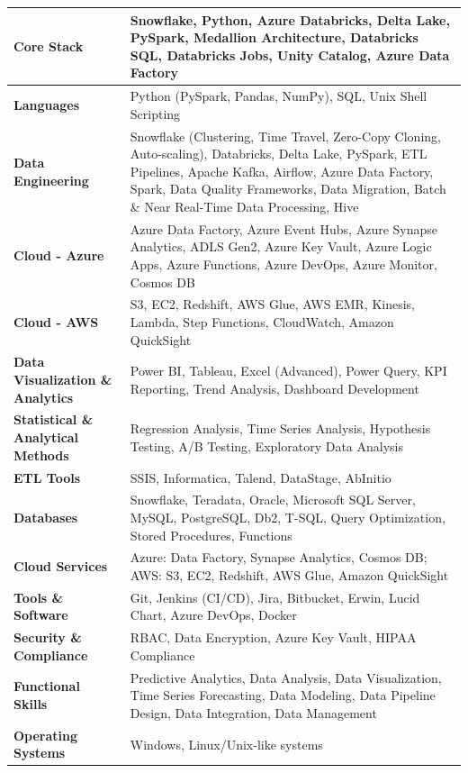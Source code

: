 \documentclass[a4paper,10pt]{article}
\begin{document}
\begin{longtable}{|p{}|p{}|}
\hline
\textbf{Core Stack} & Snowflake, Python, Azure Databricks, Delta Lake, PySpark, Medallion Architecture, Databricks SQL, Databricks Jobs, Unity Catalog, Azure Data Factory \\
\hline
\textbf{Languages} & Python (PySpark, Pandas, NumPy), SQL, Unix Shell Scripting \\
\hline
\textbf{Data Engineering} & Snowflake (Clustering, Time Travel, Zero-Copy Cloning, Auto-scaling), Databricks, Delta Lake, PySpark, ETL Pipelines, Apache Kafka, Airflow, Azure Data Factory, Spark, Data Quality Frameworks, Data Migration, Batch \& Near Real-Time Data Processing, Hive \\
\hline
\textbf{Cloud - Azure} & Azure Data Factory, Azure Event Hubs, Azure Synapse Analytics, ADLS Gen2, Azure Key Vault, Azure Logic Apps, Azure Functions, Azure DevOps, Azure Monitor, Cosmos DB \\
\hline
\textbf{Cloud - AWS} & S3, EC2, Redshift, AWS Glue, AWS EMR, Kinesis, Lambda, Step Functions, CloudWatch, Amazon QuickSight \\
\hline
\textbf{Data Visualization \& Analytics} & Power BI, Tableau, Excel (Advanced), Power Query, KPI Reporting, Trend Analysis, Dashboard Development \\
\hline
\textbf{Statistical \& Analytical Methods} & Regression Analysis, Time Series Analysis, Hypothesis Testing, A/B Testing, Exploratory Data Analysis \\
\hline
\textbf{ETL Tools} & SSIS, Informatica, Talend, DataStage, AbInitio \\
\hline
\textbf{Databases} & Snowflake, Teradata, Oracle, Microsoft SQL Server, MySQL, PostgreSQL, Db2, T-SQL, Query Optimization, Stored Procedures, Functions \\
\hline
\textbf{Cloud Services} & Azure: Data Factory, Synapse Analytics, Cosmos DB; AWS: S3, EC2, Redshift, AWS Glue, Amazon QuickSight \\
\hline
\textbf{Tools \& Software} & Git, Jenkins (CI/CD), Jira, Bitbucket, Erwin, Lucid Chart, Azure DevOps, Docker \\
\hline
\textbf{Security \& Compliance} & RBAC, Data Encryption, Azure Key Vault, HIPAA Compliance \\
\hline
\textbf{Functional Skills} & Predictive Analytics, Data Analysis, Data Visualization, Time Series Forecasting, Data Modeling, Data Pipeline Design, Data Integration, Data Management \\
\hline
\textbf{Operating Systems} & Windows, Linux/Unix-like systems \\
\hline
\end{longtable}
\end{document}
